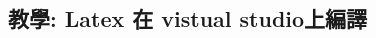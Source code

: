 \documentclass[12pt]{article}
\begin{document}
\begin{CJK*}{UTF8}{bsmi}

    \section{教學: Latex 在 vistual studio上編譯}

\end{CJK*}
\end{document}
